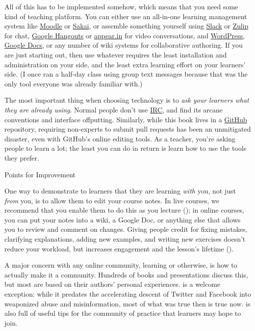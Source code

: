All of this has to be implemented somehow, which means that you need
some kind of teaching platform.  You can either use an all-in-one
learning management system like \href{http://moodle.org}{Moodle} or
\href{https://www.sakaiproject.org/}{Sakai}, or assemble something
yourself using \href{http://slack.com}{Slack} or
\href{https://zulipchat.com/}{Zulip} for chat,
\href{http://hangouts.google.com}{Google Hangouts} or
\href{https://appear.in/}{appear.in} for video conversations, and
\href{https://wordpress.org/}{WordPress},
\href{http://docs.google.com}{Google Docs}, or any number of wiki
systems for collaborative authoring. If you are just starting out,
then use whatever requires the least installation and administration
on your side, and the least extra learning effort on your learners'
side. (I once ran a half-day class using group text messages because
that was the only tool everyone was already familiar with.)

The most important thing when choosing technology is to \emph{ask your
  learners what they are already using}.  Normal people don't use
\href{https://en.wikipedia.org/wiki/Internet_Relay_Chat}{IRC}, and
find its arcane conventions and interface offputting. Similarly, while
this book lives in a \href{http://github.com}{GitHub} repository,
requiring non-experts to submit pull requests has been an unmitigated
disaster, even with GitHub's online editing tools. As a teacher,
you're asking people to learn a lot; the least you can do in return is
learn how to use the tools they prefer.

\begin{callout}{Points for Improvement}

  One way to demonstrate to learners that they are learning
  \emph{with} you, not just \emph{from} you, is to allow them to edit
  your course notes. In live courses, we recommend that you enable
  them to do this as you lecture (); in
  online courses, you can put your notes into a wiki, a Google Doc, or
  anything else that allows you to review and comment on changes.
  Giving people credit for fixing mistakes, clarifying explanations,
  adding new examples, and writing new exercises doesn't reduce your
  workload, but increases engagement and the lesson's lifetime
  ().

\end{callout}

A major concern with any online community, learning or otherwise, is
how to actually make it a community. Hundreds of books and
presentations discuss this, but most are based on their authors'
personal experiences. \cite{Krau2016} is a welcome exception: while it
predates the accelerating descent of Twitter and Facebook into
weaponized abuse and misinformation, most of what was true then is
true now.  \cite{Foge2005} is also full of useful tips for the
community of practice that learners may hope to join.

